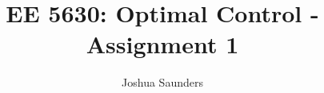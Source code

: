 \documentclass[12pt]{article}
\begin{document}

\title{EE 5630: Optimal Control - Assignment 1}%
\author{Joshua Saunders\\ %
} %

\maketitle

 \newpage
 \newpage
 \newpage
 \newpage

\newpage


\end{document}
